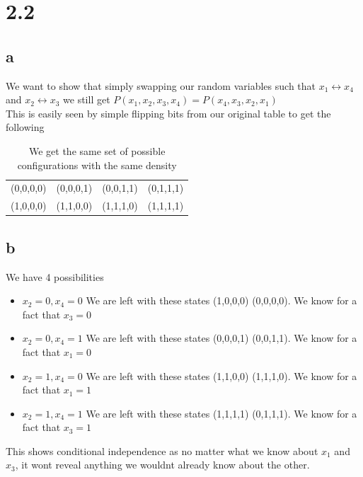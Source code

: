 \documentclass[12pt]{article}
\begin{document}
	\section{2.2} 
	\subsection{a}
	We want to show that simply swapping our random variables such that $x_1 \leftrightarrow x_4$ and $x_2 \leftrightarrow x_3$ we still get $P(x_1,x_2,x_3,x_4) = P(x_4,x_3,x_2,x_1)$
	\\
	This is easily seen by simple flipping bits from our original table to get the following 
	\begin{table}[H]
		\begin{center}
			\begin{tabular}{ c c c c }
				\hline

				(0,0,0,0)&(0,0,0,1)&(0,0,1,1)&(0,1,1,1)\\
				(1,0,0,0)&(1,1,0,0)&(1,1,1,0)&(1,1,1,1)\\
				\hline
			\end{tabular}
			\caption{We get the same set of possible configurations with the same density}
		\end{center}
	\end{table}
	\subsection{b}
	We have 4 possibilities\\
	\begin{itemize}
		\item $x_2=0,x_4=0$ We are left with these states (1,0,0,0) (0,0,0,0). We know for a fact that $x_3 = 0$
		\item $x_2=0,x_4=1$ We are left with these states (0,0,0,1) (0,0,1,1). We know for a fact that $x_1 = 0$  
		\item $x_2=1,x_4=0$ We are left with these states (1,1,0,0) (1,1,1,0). We know for a fact that $x_1 = 1$  
		\item $x_2=1,x_4=1$ We are left with these states (1,1,1,1) (0,1,1,1). We know for a fact that $x_3 = 1$  
	\end{itemize}
This shows conditional independence as no matter what we know about $x_1$ and $x_3$, it wont reveal anything we wouldnt already know about the other.
\end{document}
